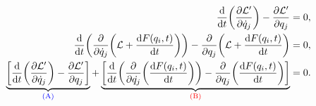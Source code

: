 \begin{problema}
    \kant[1]
\end{problema}
\solution

\kant[1-2]

\begin{align}
    \dv{t}(\pdv{\mathcal{L}^{\prime}}{\dot{q}_{j}}) - \pdv{\mathcal{L}^{\prime}}{q_{j}} &= 0,\\
    \dv{t}(\pdv{\dot{q}_{j}}(\mathcal{L} + \dv{F(q_{i},t)}{t})) - \pdv{q_{j}}(\mathcal{L} + \dv{F(q_{i},t)}{t}) &= 0,\\
    \underbrace{\left[\dv{t}(\pdv{\mathcal{L}^{\prime}}{\dot{q}_{j}}) - \pdv{\mathcal{L}^{\prime}}{q_{j}}\right]}_{\text{\textcolor{blue}{(A)}}} + \underbrace{\left[\dv{t}(\pdv{\dot{q_{j}}}(\dv{F(q_{i},t)}{t})) - \pdv{q_{j}}(\dv{F(q_{i},t)}{t})\right]}_{\text{\textcolor{red}{(B)}}} &= 0.
\end{align}